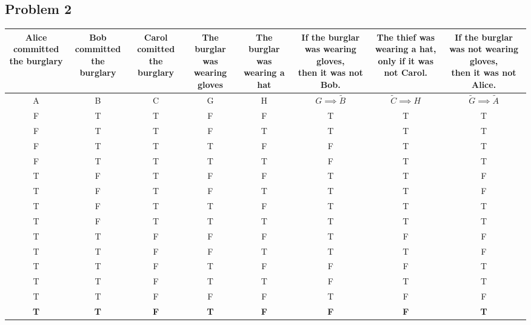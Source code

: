 \documentclass{article}
\begin{document}
\begin{landscape}
    \section*{Problem 2}
    \footnotesize
    \begin{tabular}{|c|c|c|c|c|c|c|c|}
        \hline
        \makecell{Alice committed\\the burglary} &
        \makecell{Bob committed\\the burglary} &
        \makecell{Carol comitted\\the burglary} &
        \makecell{The burglar was\\wearing gloves} &
        \makecell{The burglar was\\wearing a hat} &
        \makecell{If the burglar was wearing gloves,\\ then it was not Bob.} &
        \makecell{The thief was wearing a hat,\\ only if it was not Carol.} &
        \makecell{If the burglar was not wearing gloves,\\ then it was not Alice.} \\
        \hline
        A & B & C & G & H & \(G \implies \tilde{B}\) & \(\tilde{C} \implies H\) & \(\tilde{G} \implies \tilde{A}\) \\
        \hline
        F & T & T & F & F & T & T & T \\
        F & T & T & F & T & T & T & T \\
        F & T & T & T & F & F & T & T \\
        F & T & T & T & T & F & T & T \\
        T & F & T & F & F & T & T & F \\
        T & F & T & F & T & T & T & F \\
        T & F & T & T & F & T & T & T \\
        T & F & T & T & T & T & T & T \\
        T & T & F & F & F & T & F & F \\
        T & T & F & F & T & T & T & F \\
        T & T & F & T & F & F & F & T \\
        T & T & F & T & T & F & T & T \\
        \hline
        T & T & F & F & F & T & F & F \\
        \textbf{T} & \textbf{T} & \textbf{F} & \textbf{T} & \textbf{F} & \textbf{F} & \textbf{F} & \textbf{T} \\
        \hline
    \end{tabular}\\
    \normalsize

\end{landscape}
\end{document}
